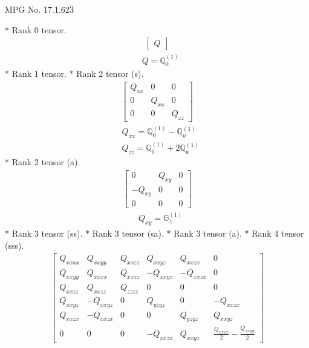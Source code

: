\documentclass[fleqn,8pt,landscape]{jsarticle}
\begin{document}
\setcounter{MaxMatrixCols}{32}

\renewcommand{\tablename}{Table~}
\renewcommand{\figurename}{Figure~}
\begin{center}
\LARGE
MPG No. 17.1.62\quad$\bar{3}$
\end{center}
* Rank 0 tensor.
\begin{align*}
\begin{bmatrix} Q \end{bmatrix}
\end{align*}
\begin{align*}
& Q = \mathbb{Q}_{0}^{(1)}
\end{align*}
* Rank 1 tensor.
* Rank 2 tensor (s).
\begin{align*}
\begin{bmatrix} Q_{xx} & 0 & 0 \\ 0 & Q_{xx} & 0 \\ 0 & 0 & Q_{zz} \end{bmatrix}
\end{align*}
\begin{align*}
& Q_{xx} = \mathbb{Q}_{0}^{(1)} - \mathbb{Q}_{u}^{(1)} \\
& Q_{zz} = \mathbb{Q}_{0}^{(1)} + 2 \mathbb{Q}_{u}^{(1)}
\end{align*}
* Rank 2 tensor (a).
\begin{align*}
\begin{bmatrix} 0 & Q_{xy} & 0 \\ - Q_{xy} & 0 & 0 \\ 0 & 0 & 0 \end{bmatrix}
\end{align*}
\begin{align*}
& Q_{xy} = \mathbb{G}_{z}^{(1)}
\end{align*}
* Rank 3 tensor (ss).
* Rank 3 tensor (sa).
* Rank 3 tensor (a).
* Rank 4 tensor (sss).
\begin{align*}
\begin{bmatrix} Q_{xxxx} & Q_{xxyy} & Q_{xxzz} & Q_{xxyz} & Q_{xxzx} & 0 \\ Q_{xxyy} & Q_{xxxx} & Q_{xxzz} & - Q_{xxyz} & - Q_{xxzx} & 0 \\ Q_{xxzz} & Q_{xxzz} & Q_{zzzz} & 0 & 0 & 0 \\ Q_{xxyz} & - Q_{xxyz} & 0 & Q_{yzyz} & 0 & - Q_{xxzx} \\ Q_{xxzx} & - Q_{xxzx} & 0 & 0 & Q_{yzyz} & Q_{xxyz} \\ 0 & 0 & 0 & - Q_{xxzx} & Q_{xxyz} & \frac{Q_{xxxx}}{2} - \frac{Q_{xxyy}}{2} \end{bmatrix}
\end{align*}
\end{document}
